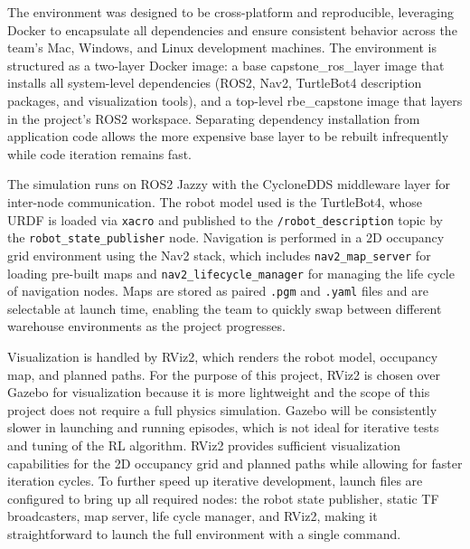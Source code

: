 \documentclass[conference]{IEEEtran}
\begin{document}
    The environment was designed to be cross-platform and reproducible, leveraging Docker to encapsulate all dependencies and ensure
    consistent behavior across the team's Mac, Windows, and Linux development machines. The environment is structured as a two-layer Docker image:
    a base capstone\_ros\_layer image that installs all system-level dependencies (ROS2, Nav2, TurtleBot4 description packages, and visualization
    tools), and a top-level rbe\_capstone image that layers in the project's ROS2 workspace. Separating dependency installation from application
    code allows the more expensive base layer to be rebuilt infrequently while code iteration remains fast.

    The simulation runs on ROS2 Jazzy with the CycloneDDS middleware layer for inter-node communication. The robot model used is the TurtleBot4,
    whose URDF is loaded via \texttt{xacro} and published to the \texttt{/robot\_description} topic by the \texttt{robot\_state\_publisher} node.
    Navigation is performed in a 2D occupancy grid environment using the Nav2 stack, which includes \texttt{nav2\_map\_server} for loading pre-built
    maps and \texttt{nav2\_lifecycle\_manager} for managing the life cycle of navigation nodes. Maps are stored as paired \texttt{.pgm} and
    \texttt{.yaml} files and are selectable at launch time, enabling the team to quickly swap between different warehouse environments as the project
    progresses.

    Visualization is handled by RViz2, which renders the robot model, occupancy map, and planned paths. For the purpose of this project, RViz2 is chosen
    over Gazebo for visualization because it is more lightweight and the scope of this project does not require a full physics simulation. Gazebo will
    be consistently slower in launching and running episodes, which is not ideal for iterative tests and tuning of the RL algorithm. RViz2 provides
    sufficient visualization capabilities for the 2D occupancy grid and planned paths while allowing for faster iteration cycles. To further speed up iterative
    development, launch files are configured to bring up all required nodes: the robot state publisher, static TF broadcasters, map server, life cycle manager,
    and RViz2, making it straightforward to launch the full environment with a single command. 
\end{document}

